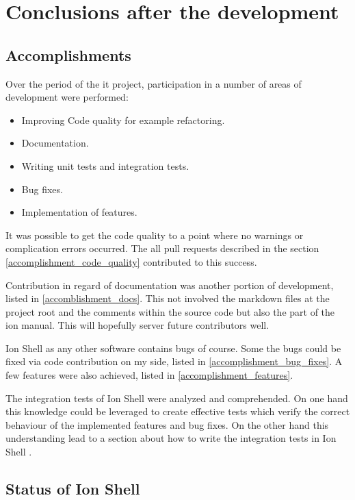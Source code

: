 \chapter{Conclusions after the development}

\section{Accomplishments}
Over the period of the it project, participation in a number of areas of development were performed:

\begin{itemize}
	\item Improving Code quality for example refactoring.
	\item Documentation.
	\item Writing unit tests and integration tests.
	\item Bug fixes.
	\item Implementation of features.
\end{itemize}

It was possible to get the code quality to a point where no warnings or complication errors occurred.
The all pull requests described in the section \ref{accomplishment_code_quality} contributed to this success.

Contribution in regard of documentation was another portion of development, listed in \ref{accomblishment_docs}.
This not involved the markdown files at the project root and the comments within the source code but also the part of the ion manual.
This will hopefully server future contributors well.

Ion Shell as any other software contains bugs of course. Some the bugs could be fixed via code contribution on my side, listed in \ref{accomplishment_bug_fixes}.
A few features were also achieved, listed in \ref{accomplishment_features}.

The integration tests of Ion Shell were analyzed and comprehended. On one hand this knowledge could be leveraged to create effective tests
which verify the correct behaviour of the implemented features and bug fixes.
On the other hand this understanding lead to a section about how to write the integration tests in Ion Shell \cite{pr_docs_how_to_integration_test}.

\section{Status of Ion Shell}


